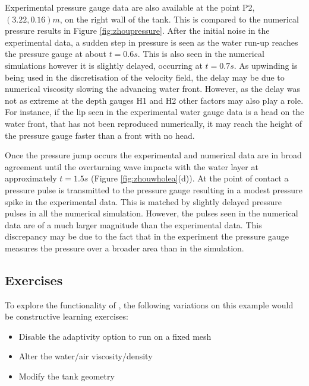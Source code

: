 Experimental pressure gauge data are also available at the point P2, $(3.22,0.16)m$, on the right wall of the tank.  This is compared to the numerical pressure results in Figure \ref{fig:zhoupressure}.  After the initial noise in the experimental data, a sudden step in pressure is seen as the water run-up reaches the pressure gauge at about $t=0.6s$.  This is also seen in the numerical simulations however it is slightly delayed, occurring at $t=0.7s$.  As upwinding is being used in the discretisation of the velocity field, the delay may be due to numerical viscosity slowing the advancing water front.  However, as the delay was not as extreme at the depth gauges H1 and H2 other factors may also play a role.  For instance, if the lip seen in the experimental water gauge data is a head on the water front, that has not been reproduced numerically, it may reach the height of the pressure gauge faster than a front with no head.

Once the pressure jump occurs the experimental and numerical data are in broad agreement until the overturning wave impacts with the water layer at approximately $t=1.5s$ (Figure \ref{fig:zhouwholea}(d)).  At the point of contact a pressure pulse is transmitted to the pressure gauge resulting in a modest pressure spike in the experimental data.  This is matched by slightly delayed pressure pulses in all the numerical simulation.  However, the pulses seen in the numerical data are of a much larger magnitude than the experimental data. This discrepancy may be due to the fact that in the experiment the pressure gauge measures the pressure over a broader area than in the simulation. 

\subsection{Exercises}
To explore the functionality of \fluidity, the following variations on this example would be constructive learning exercises:

\begin{itemize}
\item Disable the adaptivity option to run on a fixed mesh
\item Alter the water/air viscosity/density
\item Modify the tank geometry
\end{itemize}





